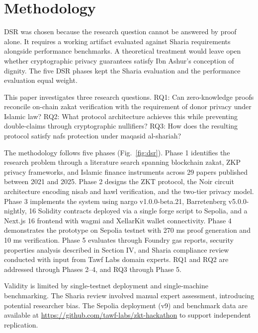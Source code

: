 \documentclass[conference]{IEEEtran}
\begin{document}
\section{Methodology}

DSR was chosen because the research question cannot be answered by proof alone\cite{b_zkp_financial}. It requires a working artifact evaluated against Sharia requirements alongside performance benchmarks\cite{b_maqasid_data}\cite{b_zkp_financial}. A theoretical treatment would leave open whether cryptographic privacy guarantees satisfy Ibn Ashur's conception of dignity\cite{b_maqasid_privacy}. The five DSR phases kept the Sharia evaluation and the performance evaluation equal weight.

This paper investigates three research questions. RQ1: Can zero-knowledge proofs reconcile on-chain zakat verification with the requirement of donor privacy under Islamic law\cite{b_zkfi}\cite{b_maqasid_privacy}? RQ2: What protocol architecture achieves this while preventing double-claims through cryptographic nullifiers\cite{b_aztec}\cite{b_zkp_blockchain}? RQ3: How does the resulting protocol satisfy nafs protection under maqasid al-shariah\cite{b_maqasid_data}\cite{b_maqasid_fintech}?

The methodology follows five phases (Fig.~\ref{fig:dsr}). Phase 1 identifies the research problem through a literature search spanning blockchain zakat\cite{b_zakat_acm}\cite{b_zakat_malaysia}\cite{b_zakat_transparency}, ZKP privacy frameworks\cite{b_zkp_circuits}\cite{b_zkp_financial}\cite{b_zkfi}, and Islamic finance instruments across 29 papers published between 2021 and 2025\cite{b_zakat_biblio}. Phase 2 designs the ZKT protocol, the Noir circuit architecture encoding nisab and hawl verification\cite{b_noir}, and the two-tier privacy model\cite{b_zkfi}\cite{b_zkp_idm}. Phase 3 implements the system using nargo v1.0.0-beta.21, Barretenberg v5.0.0-nightly\cite{b_aztec}, 16 Solidity contracts deployed via a single forge script to Sepolia, and a Next.js 16 frontend with wagmi and XellarKit wallet connectivity\cite{b_pwa_survey}. Phase 4 demonstrates the prototype on Sepolia testnet with 270 ms proof generation and 10 ms verification\cite{b_aztec}. Phase 5 evaluates through Foundry gas reports, security properties analysis described in Section IV, and Sharia compliance review conducted with input from Tawf Labs domain experts\cite{b_maqasid_data}\cite{b_maqasid_privacy}. RQ1 and RQ2 are addressed through Phases 2--4, and RQ3 through Phase 5.

Validity is limited by single-testnet deployment and single-machine benchmarking. The Sharia review involved manual expert assessment, introducing potential researcher bias. The Sepolia deployment (v9) and benchmark data are available at \url{https://github.com/tawf-labs/zkt-hackathon} to support independent replication.
\end{document}

